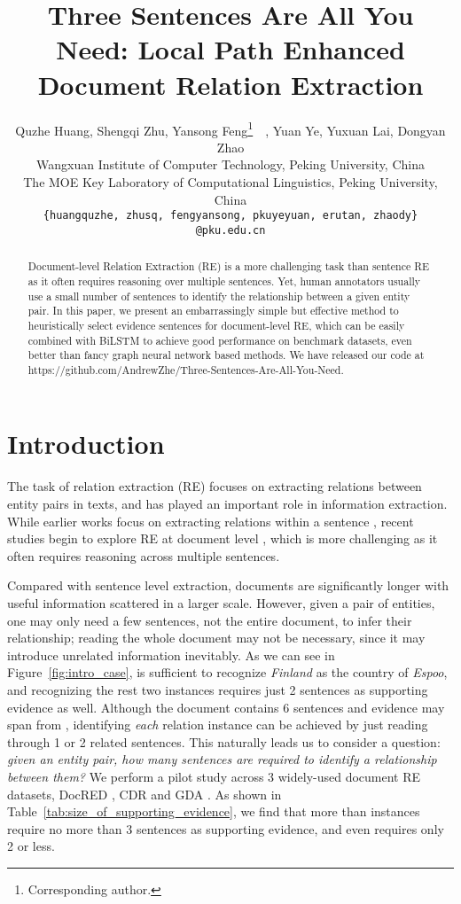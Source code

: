 \documentclass[11pt,a4paper]{article}
\title{Three Sentences Are All You Need: Local Path Enhanced Document Relation Extraction}
\author{
    Quzhe Huang, 
    Shengqi Zhu, 
    Yansong Feng\thanks{\;\;Corresponding author.}~~,  
    Yuan Ye,
    Yuxuan Lai,
    Dongyan Zhao \\
    Wangxuan Institute of Computer Technology, Peking University, China\\
    The MOE Key Laboratory of Computational Linguistics, Peking University, China\\
    {\tt \{huangquzhe, zhusq, fengyansong, pkuyeyuan, erutan, zhaody\}} 
    \\ {\tt @pku.edu.cn} \\
}
\date{}
\begin{document}
\maketitle
\begin{abstract}
Document-level Relation Extraction (RE) is a more challenging task than sentence RE as it often requires reasoning over multiple sentences. Yet, human annotators usually use a small number of sentences to identify the relationship between a given entity pair. In this paper, we present an embarrassingly simple but effective method to heuristically select evidence sentences for document-level RE, which can be easily combined with BiLSTM to achieve 
good performance on benchmark datasets, even better than fancy graph neural network based methods.  We have released our code at https://github.com/AndrewZhe/Three-Sentences-Are-All-You-Need.

\end{abstract}



\section{Introduction}
The task of relation extraction (RE) focuses on extracting relations between entity pairs in texts, and has played an important role in information extraction. While earlier works focus on extracting relations within a sentence \cite{lin2016neural, zhang-etal-2018-graph},
recent studies begin to explore RE at document level \cite{peng2017cross,zeng-etal-2020-double, nan-etal-2020-reasoning},
which is more challenging as it often requires reasoning across multiple sentences.

Compared with sentence level extraction, documents are significantly longer with useful information scattered in a larger scale. However, given a pair of entities, one may only need a few sentences, not the entire document, to infer their relationship; reading the whole document may not be necessary, since it may introduce unrelated information inevitably.
As we can see in Figure~\ref{fig:intro_case},  is sufficient to recognize \textit{Finland} as the country of \textit{Espoo}, and recognizing the rest two instances requires just 2 sentences as supporting evidence as well. Although the document contains 6 sentences and evidence may span from , identifying \textit{each} relation instance can be achieved by just reading through 1 or 2 related sentences. This naturally leads us to consider a question: \textit{given an entity pair, how many sentences are required to identify a relationship between them?} We perform a pilot study across 
3 widely-used document RE datasets, DocRED \cite{yao_docred_2019}, CDR \cite{li2016biocreative} and GDA \cite{wu2019renet}. As shown in Table~\ref{tab:size_of_supporting_evidence}, we find that more than  instances require no more than 3 sentences as supporting evidence, and  even requires only 2 or less.
\end{document}
